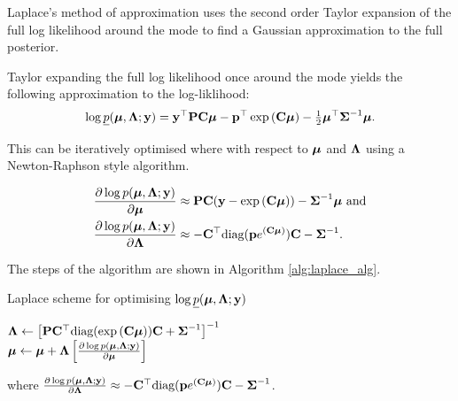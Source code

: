 \documentclass[times, doublespace]{anzsauth}
\begin{document}
	Laplace's method of approximation uses the second order Taylor expansion of the full log likelihood around
	the mode to find a Gaussian approximation to the full posterior. 
	
	
	Taylor expanding the full log likelihood once around the mode yields the following approximation to the
	log-liklihood:
	\begin{align*}
		\log \underline{p}({\boldsymbol \mu}, {\boldsymbol \Lambda}; {\bf y}) = {\bf y}^\top{\bf P}{\bf C}{\boldsymbol\mu} - {\bf p}^\top\exp \left ({\bf C} {\boldsymbol \mu} \right ) - \tfrac{1}{2} {\boldsymbol \mu}^\top {\boldsymbol\Sigma}^{-1} {\boldsymbol \mu}. 
	\end{align*}
	
	This can be iteratively optimised  where with respect to ${\boldsymbol \mu}$ and ${\boldsymbol \Lambda}$ using a Newton-Raphson style
	algorithm.

	\begin{align*}
		\frac{\partial \log p({\boldsymbol \mu}, {\boldsymbol \Lambda}; {\bf y})}{\partial {\boldsymbol\mu}}     & \approx {\bf P} {\bf C} ({\bf y} - \exp{({\bf C}{\boldsymbol\mu})}) - {\boldsymbol \Sigma}^{-1} {\boldsymbol \mu} \text{ and} \\
		\frac{\partial \log p({\boldsymbol \mu}, {\boldsymbol \Lambda}; {\bf y})}{\partial {\boldsymbol\Lambda}} & \approx - {\bf C}^\top \text{diag}({\bf p} e^{({\bf C} {\boldsymbol \mu})}) {\bf C} - {\boldsymbol \Sigma}^{-1}.   
	\end{align*}
	
	The steps of the algorithm are shown in Algorithm \ref{alg:laplace_alg}.
	
	\begin{algorithm}
		\caption{Laplace scheme for optimising $\log \underline{p}({\boldsymbol \mu}, {\boldsymbol \Lambda}; {\bf y})$}
		\label{alg:laplace_alg}
		\begin{algorithmic}
			\STATE ${\boldsymbol \Lambda} \leftarrow \left [{\bf P} {\bf C}^\top \text{diag}(\exp{({\bf C}{\boldsymbol\mu})}) {\bf C} + {\boldsymbol \Sigma}^{-1} \right ]^{-1}$ \\ [1ex] 
			\STATE ${\boldsymbol \mu} \leftarrow {\boldsymbol\mu} + {\boldsymbol \Lambda} \left [ \frac{\partial \log p({\boldsymbol \mu}, {\boldsymbol \Lambda}; {\bf y})}{\partial {\boldsymbol\mu}} \right ]$ \\ [1ex]
			\ENDWHILE
		\end{algorithmic}
		where $\frac{\partial \log p({\boldsymbol \mu}, {\boldsymbol \Lambda}; {\bf y})}{\partial {\boldsymbol\Lambda}} \approx - {\bf C}^\top \text{diag}({\bf p} e^{({\bf C} {\boldsymbol \mu})}) {\bf C} - {\boldsymbol \Sigma}^{-1}$.
	\end{algorithm}
	
\end{document}
